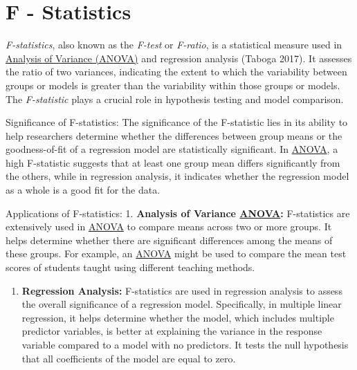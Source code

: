 \documentclass[
  a4paper,
]{scrbook}
\providecommand{\tightlist}{%
  \setlength{\itemsep}{0pt}\setlength{\parskip}{0pt}}\usepackage{longtable,booktabs,array}
\begin{document}
\section{F - Statistics}\label{f---statistics}

\emph{F-statistics}, also known as the \emph{F-test} or \emph{F-ratio},
is a statistical measure used in \hyperref[acronyms_ANOVA]{Analysis of
Variance (ANOVA)} and regression analysis (Taboga 2017). It assesses the
ratio of two variances, indicating the extent to which the variability
between groups or models is greater than the variability within those
groups or models. The \emph{F-statistic} plays a crucial role in
hypothesis testing and model comparison.

Significance of F-statistics: The significance of the F-statistic lies
in its ability to help researchers determine whether the differences
between group means or the goodness-of-fit of a regression model are
statistically significant. In \hyperref[acronyms_ANOVA]{ANOVA}, a high
F-statistic suggests that at least one group mean differs significantly
from the others, while in regression analysis, it indicates whether the
regression model as a whole is a good fit for the data.

Applications of F-statistics: 1. \textbf{Analysis of Variance
\hyperref[acronyms_ANOVA]{ANOVA}:} F-statistics are extensively used in
\hyperref[acronyms_ANOVA]{ANOVA} to compare means across two or more
groups. It helps determine whether there are significant differences
among the means of these groups. For example, an
\hyperref[acronyms_ANOVA]{ANOVA} might be used to compare the mean test
scores of students taught using different teaching methods.

\begin{enumerate}
\def\labelenumi{\arabic{enumi}.}
\setcounter{enumi}{1}
\tightlist
\item
  \textbf{Regression Analysis:} F-statistics are used in regression
  analysis to assess the overall significance of a regression model.
  Specifically, in multiple linear regression, it helps determine
  whether the model, which includes multiple predictor variables, is
  better at explaining the variance in the response variable compared to
  a model with no predictors. It tests the null hypothesis that all
  coefficients of the model are equal to zero.
\end{enumerate}
\end{document}
